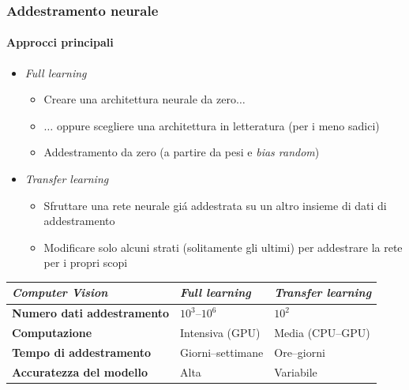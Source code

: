 %
\begin{frame}[t] \frametitle{Addestramento neurale}
\framesubtitle{Approcci principali}
{\small
{}
	\begin{itemize}[leftmargin=10pt,align=right]
		\item[\alert{\faArrowCircleRight}] \emph{Full learning}
		\begin{itemize}[leftmargin=10pt,align=right]
			\item[\alert{\faArrowCircleRight}] Creare una architettura neurale da zero$\ldots$
			\item[\alert{\faArrowCircleRight}] $\ldots$ oppure scegliere una architettura in letteratura (per i meno sadici)
			\item[\alert{\faArrowCircleRight}] Addestramento da zero (a partire da pesi e \emph{bias random})
		\end{itemize}
		\item[\alert{\faArrowCircleRight}] \emph{Transfer learning}
		\begin{itemize}[leftmargin=10pt,align=right]
			\item[\alert{\faArrowCircleRight}] Sfruttare una rete neurale gi\'{a} addestrata su un altro insieme di dati di addestramento
			\item[\alert{\faArrowCircleRight}] Modificare solo alcuni strati (solitamente gli ultimi) per addestrare la rete per i propri scopi
		\end{itemize}
	\end{itemize}
	{\footnotesize
		\begin{table}
			\renewcommand{\arraystretch}{1}
			\centering
			\begin{tabularx}{\textwidth}{Xp{2.5cm}p{2.5cm}}
				\toprule
				\textbf{\emph{Computer Vision}} & \textbf{\emph{Full learning}} & \textbf{\emph{Transfer learning}}\\
				\midrule

				\textbf{Numero dati addestramento} & $10^{3}$--$10^{6}$ & $10^{2}$\\
				\textbf{Computazione} & Intensiva (GPU) & Media (CPU--GPU)\\
				\textbf{Tempo di addestramento} & Giorni--settimane & Ore--giorni\\
				\textbf{Accuratezza del modello} & Alta & Variabile\\
				\bottomrule
			\end{tabularx}
		\end{table}
	}
}
\end{frame}

